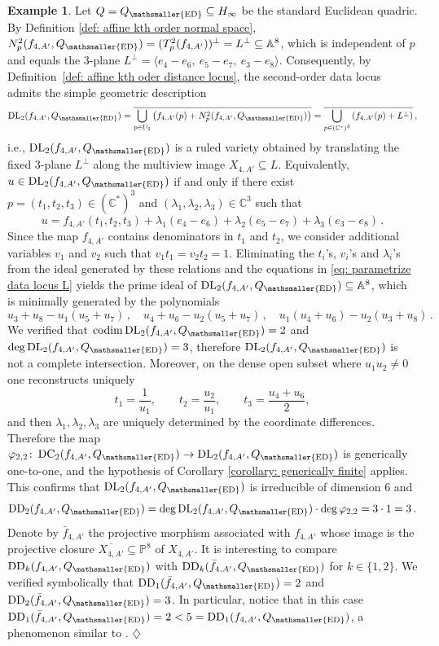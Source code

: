 \documentclass[11pt,reqno]{amsart}
\numberwithin{equation}{section}
\theoremstyle{plain}
\numberwithin{theorem}{section}
\theoremstyle{definition}
\newtheorem{example}[theorem]{Example}
\newcommand{\A}{\mathbb{A}}
\renewcommand{\P}{\mathbb{P}}
\newcommand{\C}{\mathbb{C}}
\newcommand{\codim}{\operatorname{codim}}
\newcommand{\DC}{\operatorname{DC}}
\newcommand{\DL}{\operatorname{DL}}
\newcommand{\DD}{\operatorname{DD}}
\newcommand{\mED}{\mathsmaller{\mathrm{ED}}}
\begin{document}
\begin{example}
Let $Q=Q_\mED\subseteq H_\infty$ be the standard Euclidean quadric. By Definition \ref{def: affine kth order normal space}, $N^2_p(f_{4,A'},Q_\mED)=(T^2_p(f_{4,A'}))^\perp=L^\perp\subseteq \A^8$, which is independent of $p$ and equals the $3$-plane $L^\perp=\langle e_4-e_6,\ e_5-e_7,\ e_3-e_8\rangle$.
Consequently, by Definition~\ref{def: affine kth oder distance locus}, the second-order data locus admits the simple geometric description
\[
\DL_2(f_{4,A'},Q_\mED)=\overline{\bigcup_{p\in U_2}\left(f_{4,A'}(p)+N^2_p(f_{4,A'},Q_\mED)\right)}
=\overline{\bigcup_{p\in(\C^\ast)^3}\left(f_{4,A'}(p)+L^\perp\right)}\,,
\]
i.e., $\DL_2(f_{4,A'},Q_\mED)$ is a ruled variety obtained by translating the fixed $3$-plane $L^\perp$ along the multiview image $X_{4,A'}\subseteq L$.
Equivalently, $u\in \DL_2(f_{4,A'},Q_\mED)$ if and only if there exist $p=(t_1,t_2,t_3)\in(\C^\ast)^3$ and
$(\lambda_1,\lambda_2,\lambda_3)\in\C^3$ such that
\begin{equation}\label{eq: parametrize data locus L}
u=f_{4,A'}(t_1,t_2,t_3)+\lambda_1(e_4-e_6)+\lambda_2(e_5-e_7)+\lambda_3(e_3-e_8)\,.
\end{equation}
Since the map $f_{4,A'}$ contains denominators in $t_1$ and $t_2$, we consider additional variables $v_1$ and $v_2$ such that $v_1t_1=v_2t_2=1$.
Eliminating the $t_i$'s, $v_i$'s and $\lambda_i$'s from the ideal generated by these relations and the equations in \eqref{eq: parametrize data locus L} yields the prime ideal of $\DL_2(f_{4,A'},Q_\mED)\subseteq\A^8$, which is minimally generated by the polynomials
\[
u_3+u_8-u_1(u_5+u_7)\,,\quad
u_4+u_6-u_2(u_5+u_7)\,,\quad u_1(u_4+u_6)-u_2(u_3+u_8)\,.
\]
We verified that $\codim\DL_2(f_{4,A'},Q_\mED)=2$ and $\deg\DL_2(f_{4,A'},Q_\mED)=3$, therefore $\DL_2(f_{4,A'},Q_\mED)$ is not a complete intersection.
Moreover, on the dense open subset where $u_1u_2\neq 0$ one reconstructs uniquely
\[
t_1=\frac1{u_1},\qquad t_2=\frac{u_2}{u_1},\qquad t_3=\frac{u_4+u_6}{2},
\]
and then $\lambda_1,\lambda_2,\lambda_3$ are uniquely determined by the coordinate differences. Therefore the map $\varphi_{2,2}\colon\DC_2(f_{4,A'},Q_\mED)\to\DL_2(f_{4,A'},Q_\mED)$ is generically one-to-one, and the hypothesis of Corollary \ref{corollary: generically finite} applies. This confirms that $\DL_2(f_{4,A'},Q_\mED)$ is irreducible of dimension $6$ and
\[
\DD_2(f_{4,A'},Q_\mED) = \deg\DL_2(f_{4,A'},Q_\mED)\cdot\deg\varphi_{2,2} = 3\cdot 1=3\,.
\]
Denote by $\bar{f}_{4,A'}$ the projective morphism associated with $f_{4,A'}$ whose image is the projective closure $\overline{X_{4,A'}}\subseteq\P^8$ of $X_{4,A'}$.
It is interesting to compare $\DD_k(f_{4,A'},Q_\mED)$ with $\DD_k(\bar{f}_{4,A'},Q_\mED)$ for $k\in\{1,2\}$. We verified symbolically that $\DD_1(\bar{f}_{4,A'},Q_\mED)=2$ and $\DD_2(\bar{f}_{4,A'},Q_\mED)=3$. In particular, notice that in this case $\DD_1(\bar{f}_{4,A'},Q_\mED)=2<5=\DD_1(f_{4,A'},Q_\mED)$, a phenomenon similar to \cite[Eq. (6.3)]{DHOST}.
\hfill$\diamondsuit$
\end{example}





\end{document}
